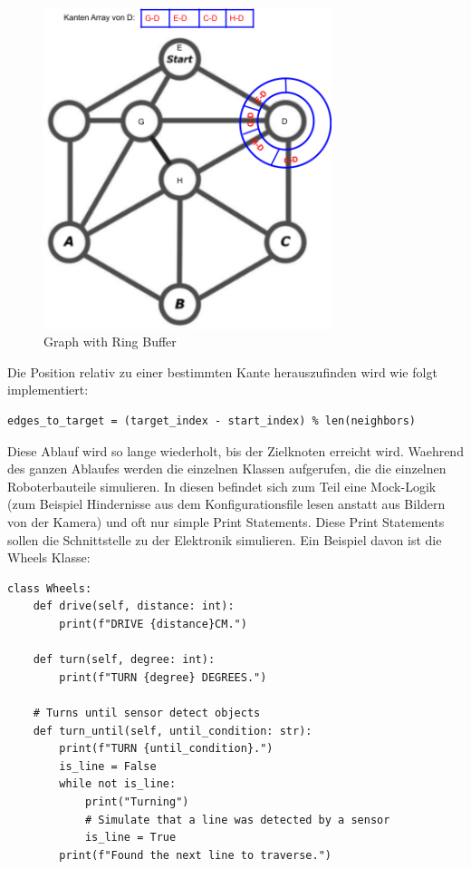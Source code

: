 \begin{figure}[H]
\centering
\includegraphics[width=0.75\textwidth]{assets/informatik-prototyp/simulator/ring-buffer-graph.png}
\caption{Graph with Ring Buffer}
\label{fig:ring-buffer-graph}
\end{figure}

Die Position relativ zu einer bestimmten Kante herauszufinden wird wie folgt implementiert:

\begin{verbatim}
edges_to_target = (target_index - start_index) % len(neighbors)
\end{verbatim}

Diese Ablauf wird so lange wiederholt, bis der Zielknoten erreicht wird.
Waehrend des ganzen Ablaufes werden die einzelnen Klassen aufgerufen, die die einzelnen Roboterbauteile simulieren. In diesen befindet sich zum Teil eine Mock-Logik (zum Beispiel Hindernisse aus dem Konfigurationsfile lesen anstatt aus Bildern von der Kamera) und oft nur simple Print Statements. Diese Print Statements sollen die Schnittstelle zu der Elektronik simulieren. Ein Beispiel davon ist die Wheels Klasse:

\begin{verbatim}
class Wheels:
    def drive(self, distance: int):
        print(f"DRIVE {distance}CM.")

    def turn(self, degree: int):
        print(f"TURN {degree} DEGREES.")

    # Turns until sensor detect objects
    def turn_until(self, until_condition: str):
        print(f"TURN {until_condition}.")
        is_line = False
        while not is_line:
            print("Turning")
            # Simulate that a line was detected by a sensor
            is_line = True
        print(f"Found the next line to traverse.")
\end{verbatim}

